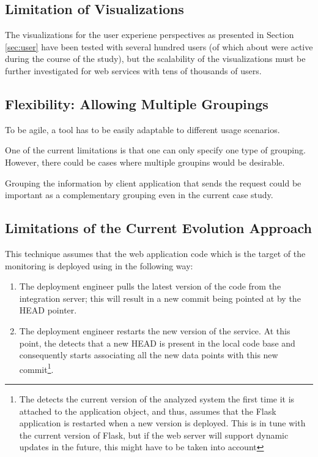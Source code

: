   \subsection*{Limitation of Visualizations }

    The visualizations for the user experiene perspectives as presented in Section \ref{sec:user} have been tested with several hundred users (of which about \activeUserCount were active during the course of the study), but the scalability of the visualizations must be further investigated for web services with tens of thousands of users.


  \subsection*{Flexibility: Allowing Multiple Groupings}

    To be agile, a tool has to be easily adaptable to different usage scenarios. 

    One of the current limitations is that one can only specify one type of grouping. 
    However, there could be cases where multiple groupins would be desirable. 
    
    Grouping the information by client application that sends the request could be important as a complementary grouping even in the current \zee case study. 

  \subsection*{Limitations of the Current Evolution Approach}

    This technique assumes that the web application code which is the target of the monitoring is deployed using \git in the following way: 

    \begin{enumerate}
      \item The deployment engineer pulls the latest version of the code from the integration server; this will result in a new commit being pointed at by the HEAD pointer. %
      \item The deployment engineer restarts the new version of the service. At this point, the \tool detects that a new HEAD is present in the local code base and consequently starts associating all the new data points with this new commit\footnote{The \tool detects the current version of the analyzed system the first time it is attached to the application object, and thus, assumes that the Flask application is restarted when a new version is deployed. This is in tune with the current version of Flask, but if the web server will support dynamic updates in the future, this might have to be taken into account}.
    \end{enumerate}

